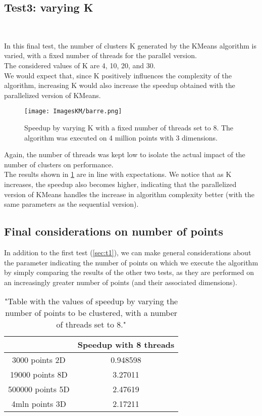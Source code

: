 \documentclass[10pt,twocolumn,letterpaper]{article}
\begin{document}
\subsection{Test3: varying K}\
\label{sec:t3}

In this final test, the number of clusters K generated by the KMeans algorithm is varied, with a fixed number of threads for the parallel version.\\
The considered values of K are 4, 10, 20, and 30.\\
We would expect that, since K positively influences the complexity of the algorithm, increasing K would also increase the speedup obtained with the parallelized version of KMeans.

\begin{figure}[h]
    \centering
    \texttt{[image: ImagesKM/barre.png]}
    \caption{Speedup by varying K with a fixed number of threads set to 8. The algorithm was executed on 4 million points with 3 dimensions.}
    \label{fig:t3}
\end{figure}

Again, the number of threads was kept low to isolate the actual impact of the number of clusters on performance.\\
The results shown in \cref{fig:t3} are in line with expectations. We notice that as K increases, the speedup also becomes higher, indicating that the parallelized version of KMeans handles the increase in algorithm complexity better (with the same parameters as the sequential version).

\subsection{Final considerations on number of points}
In addition to the first test (\cref{sec:t1}), we can make general considerations about the parameter indicating the number of points on which we execute the algorithm by simply comparing the results of the other two tests, as they are performed on an increasingly greater number of points (and their associated dimensions).

\begin{table}[h]
\centering
\begin{tabular}{ |c|c| } 
\hline
 & Speedup with 8 threads \\
\hline
3000 points 2D & 0.948598\\
\hline
19000 points 8D & 3.27011\\
\hline
500000 points 5D & 2.47619\\
\hline
4mln points 3D & 2.17211\\
\hline
\end{tabular}
\vspace*{3mm}
\caption{"Table with the values of speedup by varying the number of points to be clustered, with a number of threads set to 8."}
\label{table:t4}
\end{table}
\end{document}
